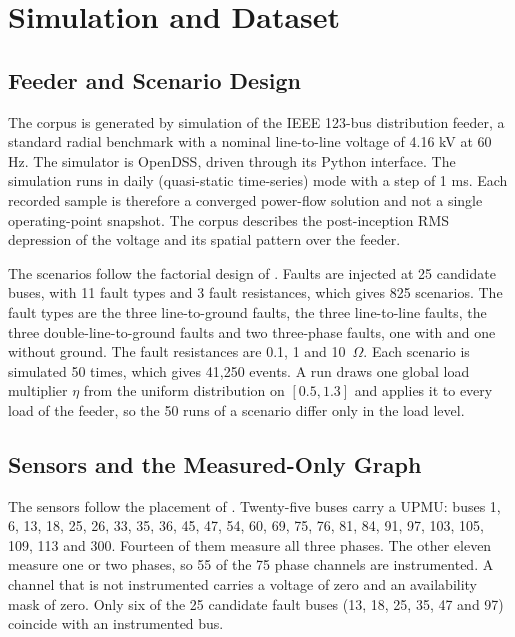 \documentclass[MTech]{ugthesis}
\begin{document}
\section{Simulation and Dataset}
\label{sec:data}

\subsection{Feeder and Scenario Design}

The corpus is generated by simulation of the IEEE 123-bus distribution feeder, a standard radial benchmark with a nominal line-to-line voltage of 4.16 kV at 60 Hz. The simulator is OpenDSS, driven through its Python interface. The simulation runs in daily (quasi-static time-series) mode with a step of 1 ms. Each recorded sample is therefore a converged power-flow solution and not a single operating-point snapshot. The corpus describes the post-inception \ac{RMS} depression of the voltage and its spatial pattern over the feeder.

The scenarios follow the factorial design of \citet{karabulut2026}. Faults are injected at 25 candidate buses, with 11 fault types and 3 fault resistances, which gives 825 scenarios. The fault types are the three line-to-ground faults, the three line-to-line faults, the three double-line-to-ground faults and two three-phase faults, one with and one without ground. The fault resistances are 0.1, 1 and 10~$\Omega$. Each scenario is simulated 50 times, which gives 41,250 events. A run draws one global load multiplier $\eta$ from the uniform distribution on $[0.5,1.3]$ and applies it to every load of the feeder, so the 50 runs of a scenario differ only in the load level.

\subsection{Sensors and the Measured-Only Graph}

The sensors follow the placement of \citet{karabulut2026}. Twenty-five buses carry a \ac{UPMU}: buses 1, 6, 13, 18, 25, 26, 33, 35, 36, 45, 47, 54, 60, 69, 75, 76, 81, 84, 91, 97, 103, 105, 109, 113 and 300. Fourteen of them measure all three phases. The other eleven measure one or two phases, so 55 of the 75 phase channels are instrumented. A channel that is not instrumented carries a voltage of zero and an availability mask of zero. Only six of the 25 candidate fault buses (13, 18, 25, 35, 47 and 97) coincide with an instrumented bus.
\end{document}
